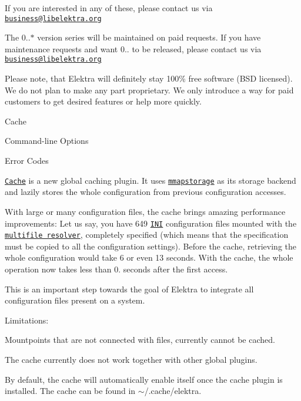 If you are interested in any of these, please contact us via \href{mailto:business@libelektra.org}{\tt business@libelektra.\+org}

The 0..$\ast$ version series will be maintained on paid requests. If you have maintenance requests and want 0.. to be released, please contact us via \href{mailto:business@libelektra.org}{\tt business@libelektra.\+org}

Please note, that Elektra will definitely stay 100\% free software (B\+SD licensed). We do not plan to make any part proprietary. We only introduce a way for paid customers to get desired features or help more quickly.


\begin{DoxyItemize}
\item Cache
\item Command-\/line Options
\item Error Codes
\end{DoxyItemize}

\href{https://www.libelektra.org/plugins/cache}{\tt Cache} is a new global caching plugin. It uses \href{https://www.libelektra.org/plugins/mmapstorage}{\tt mmapstorage} as its storage backend and lazily stores the whole configuration from previous configuration accesses.

With large or many configuration files, the cache brings amazing performance improvements\+: Let us say, you have 649 \href{https://www.libelektra.org/plugins/ini}{\tt I\+NI} configuration files mounted with the \href{https://www.libelektra.org/plugins/multifile}{\tt multifile resolver}, completely specified (which means that the specification must be copied to all the configuration settings). Before the cache, retrieving the whole configuration would take 6 or even 13 seconds. With the cache, the whole operation now takes less than 0. seconds after the first access.

This is an important step towards the goal of Elektra to integrate all configuration files present on a system.

Limitations\+:


\begin{DoxyItemize}
\item Mountpoints that are not connected with files, currently cannot be cached.
\item The cache currently does not work together with other global plugins.
\end{DoxyItemize}

By default, the cache will automatically enable itself once the {\ttfamily cache} plugin is installed. The cache can be found in {\ttfamily $\sim$/.cache/elektra}.

